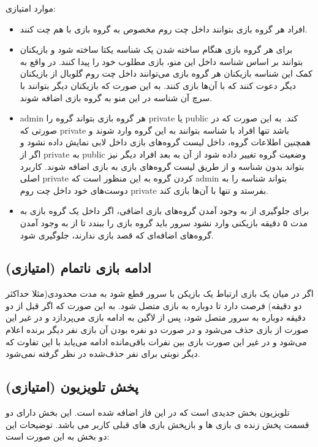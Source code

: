 \documentclass[]{article}
\begin{document}
موارد امتیازی:
\begin{itemize}
    \item افراد هر گروه بازی بتوانند داخل چت روم مخصوص به گروه بازی با هم چت کنند.
    \item برای هر گروه بازی هنگام ساخته شدن یک شناسه یکتا ساخته شود و بازیکنان بتوانند بر اساس شناسه داخل این منو، بازی مطلوب خود را پیدا کنند. در واقع به کمک این شناسه بازیکنان هر گروه بازی می‌توانند داخل چت روم گلوبال از بازیکنان دیگر دعوت کنند که با آن‌ها بازی کنند. به این صورت که بازیکنان دیگر بتوانند با سرچ آن شناسه در این منو به گروه بازی اضافه شوند.
    \item admin هر گروه بازی بتواند گروه را private یا public کند. به این صورت که در صورتی که private باشد تنها افراد با شناسه بتوانند به این گروه وارد شوند و همچنین اطلاعات گروه، داخل لیست گروه‌های بازی داخل لابی نمایش داده نشود و اگر از private به public وضعیت گروه تغییر داده شود از آن به بعد افراد دیگر نیز بتواند بدون شناسه و از طریق لیست گروه‌های بازی به بازی اضافه شوند. کاربرد اصلی private کردن گروه به این منظور است که admin بتواند شناسه را به دوست‌های خود داخل چت روم private بفرستد و تنها با آن‌ها بازی کند.
    \item برای جلوگیری از به وجود آمدن گروه‌های بازی اضافی، اگر داخل یک گروه بازی به مدت ۵ دقیقه بازیکنی وارد نشود سرور باید گروه بازی را ببندد تا از به وجود آمدن گروه‌های اضافه‌ای که قصد بازی ندارند، جلوگیری شود.

\end{itemize}



\subsection*{{\titr ادامه بازی ناتمام (امتیازی)}}
اگر در میان یک بازی ارتباط یک بازیکن با سرور قطع شود به مدت محدودی(مثلا حداکثر دو دقیقه) فرصت دارد تا دوباره به بازی متصل شود. به این صورت که اگر قبل از دو دقیقه دوباره به سرور متصل شود، پس از لاگین به ادامه بازی می‌پردازد و در غیر این صورت از بازی حذف می‌شود و در صورت دو نفره بودن آن بازی نفر دیگر برنده اعلام می‌شود و در غیر این صورت بازی بین نفرات باقی‌مانده ادامه می‌یابد با این تفاوت که دیگر نوبتی برای نفر حذف‌شده در نظر گرفته نمی‌شود.



\subsection*{{\titr پخش تلویزیون (امتیازی)}}
تلویزیون بخش جدیدی است که در این فاز اضافه شده است. این بخش دارای دو قسمت پخش زنده ی بازی ها و بازپخش بازی های قبلی کاربر می باشد. توضیحات این دو بخش به این صورت است:
\end{document}
